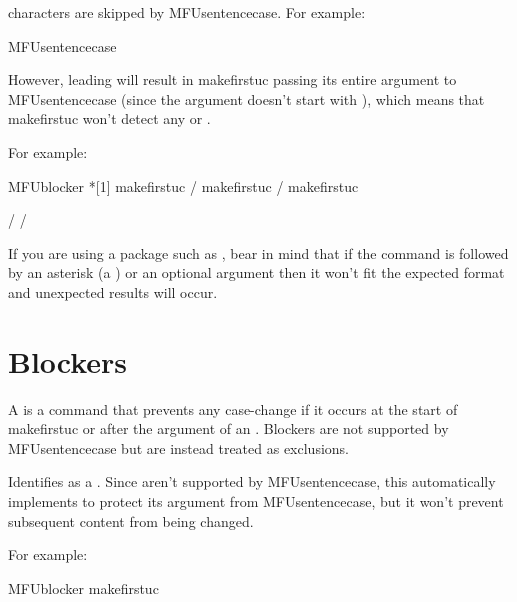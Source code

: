 \documentclass[titlepage=false,oneside,
 fontsize=12pt,captions=tableheading]{scrbook}
\begin{document}
 characters are skipped by \gls{MFUsentencecase}.
For example:
\begin{coderesult}
\gls{MFUsentencecase}
\tcblower
{}
\end{coderesult}
However, leading  will result in \gls{makefirstuc}
passing its entire argument to \gls{MFUsentencecase} (since the
argument doesn't start with ), which
means that \gls{makefirstuc} won't detect any  or
.

For example:
\begin{codebox}
\gls{MFUblocker}
*[1]
\gls{makefirstuc} /
\gls{makefirstuc} /
\gls{makefirstuc}
\end{codebox}
\begin{resultbox}
\MFUblocker{\nameref}
 /
 /
\end{resultbox}
If you are using a package such as , bear in mind that
if the command is followed by an asterisk (a )
or an optional argument then it won't fit the expected
 format and unexpected results will occur.

\section{Blockers}
\label{sec:blockers}

A  is a command that prevents any case-change if it occurs at
the start of \gls{makefirstuc} or after the argument of an
. Blockers are not supported by
\gls{MFUsentencecase} but are instead treated as exclusions. 

Identifies  as a . Since 
aren't supported by \gls{MFUsentencecase}, this automatically
implements  to protect its argument
from \gls{MFUsentencecase}, but it won't prevent subsequent content
from being changed.

For example:
\begin{codebox}
\gls{MFUblocker}
\gls{makefirstuc} 
\end{codebox}
\begin{resultbox}
\MFUblocker{\nameref}
\end{resultbox}
\end{document}
